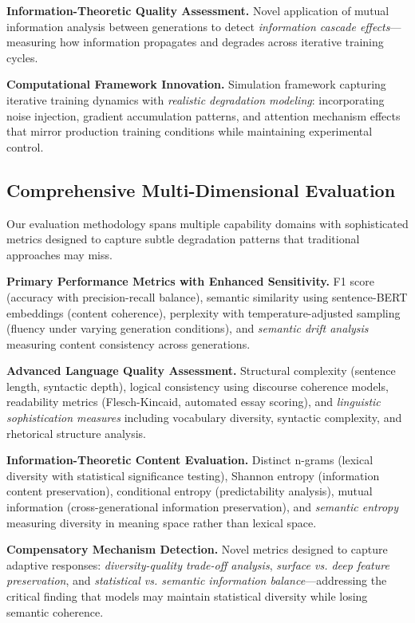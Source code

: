 \documentclass{article}
\begin{document}
\textbf{Information-Theoretic Quality Assessment.} Novel application of mutual information analysis between generations to detect \textit{information cascade effects}—measuring how information propagates and degrades across iterative training cycles.

\textbf{Computational Framework Innovation.} Simulation framework capturing iterative training dynamics with \textit{realistic degradation modeling}: incorporating noise injection, gradient accumulation patterns, and attention mechanism effects that mirror production training conditions while maintaining experimental control.

\subsection{Comprehensive Multi-Dimensional Evaluation}

Our evaluation methodology spans multiple capability domains with sophisticated metrics designed to capture subtle degradation patterns that traditional approaches may miss.

\textbf{Primary Performance Metrics with Enhanced Sensitivity.} F1 score (accuracy with precision-recall balance), semantic similarity using sentence-BERT embeddings (content coherence), perplexity with temperature-adjusted sampling (fluency under varying generation conditions), and \textit{semantic drift analysis} measuring content consistency across generations.

\textbf{Advanced Language Quality Assessment.} Structural complexity (sentence length, syntactic depth), logical consistency using discourse coherence models, readability metrics (Flesch-Kincaid, automated essay scoring), and \textit{linguistic sophistication measures} including vocabulary diversity, syntactic complexity, and rhetorical structure analysis.

\textbf{Information-Theoretic Content Evaluation.} Distinct n-grams (lexical diversity with statistical significance testing), Shannon entropy (information content preservation), conditional entropy (predictability analysis), mutual information (cross-generational information preservation), and \textit{semantic entropy} measuring diversity in meaning space rather than lexical space.

\textbf{Compensatory Mechanism Detection.} Novel metrics designed to capture adaptive responses: \textit{diversity-quality trade-off analysis}, \textit{surface vs. deep feature preservation}, and \textit{statistical vs. semantic information balance}—addressing the critical finding that models may maintain statistical diversity while losing semantic coherence.
\end{document}
